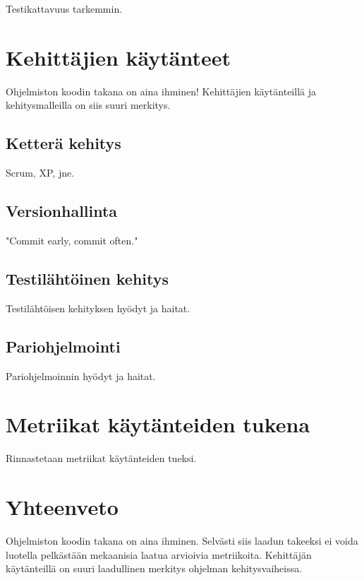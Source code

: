 \documentclass[finnish]{../tktltiki2}
\theoremstyle{definition}
\theoremstyle{remark}
\begin{document}
Testikattavuus tarkemmin.

\section{Kehittäjien käytänteet}

Ohjelmiston koodin takana on aina ihminen! Kehittäjien käytänteillä ja kehitysmalleilla on siis suuri merkitys.

\subsection{Ketterä kehitys}

Scrum, XP, jne.

\subsection{Versionhallinta}

"Commit early, commit often."

\subsection{Testilähtöinen kehitys}

Testilähtöisen kehityksen hyödyt ja haitat.

\subsection{Pariohjelmointi}

Pariohjelmoinnin hyödyt ja haitat.

\section{Metriikat käytänteiden tukena}

Rinnastetaan metriikat käytänteiden tueksi.

\section{Yhteenveto}

Ohjelmiston koodin takana on aina ihminen.  Selvästi siis laadun takeeksi ei voida luotella pelkästään mekaanisia laatua 
arvioivia metriikoita. Kehittäjän käytänteillä on suuri laadullinen merkitys ohjelman kehitysvaiheissa.




\end{document}
